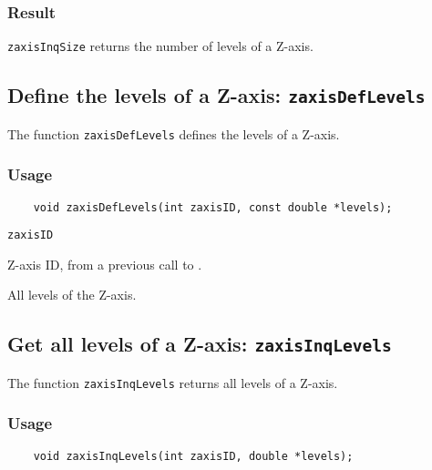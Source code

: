 \subsubsection*{Result}

{\tt zaxisInqSize} returns the number of levels of a Z-axis.



\subsection{Define the levels of a Z-axis: {\tt zaxisDefLevels}}
\label{zaxisDefLevels}

The function {\tt zaxisDefLevels} defines the levels of a Z-axis.

\subsubsection*{Usage}

\begin{verbatim}
    void zaxisDefLevels(int zaxisID, const double *levels);
\end{verbatim}

\hspace*{4mm}\begin{minipage}[]{15cm}
\begin{deflist}{\tt zaxisID\ }
\item[{\tt zaxisID}]
Z-axis ID, from a previous call to {}.
\item[{\tt levels}]
All levels of the Z-axis.

\end{deflist}
\end{minipage}


\subsection{Get all levels of a Z-axis: {\tt zaxisInqLevels}}
\label{zaxisInqLevels}

The function {\tt zaxisInqLevels} returns all levels of a Z-axis.

\subsubsection*{Usage}

\begin{verbatim}
    void zaxisInqLevels(int zaxisID, double *levels);
\end{verbatim}

